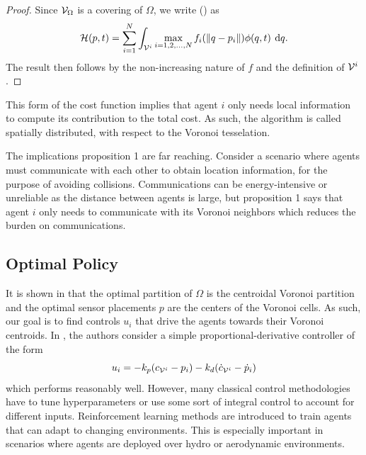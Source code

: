 \documentclass[10pt,conference]{IEEEtran}
\begin{document}
		\begin{proof}
			Since $\mathcal{V}_\Omega$ is a covering of $\Omega$, we write () as 
			\begin{equation*}
				\displaystyle \mathcal{H}(p,t) = \sum\limits_{i=1}^{N}{\int_{\V^i}{\max\limits_{i=1,2,\dots,N}{f_i(\,\norm{q - p_i})}\phi(q,t) \: \dif q}}.
			\end{equation*}
			The result then follows by the non-increasing nature of $f$ and the definition of $\mathcal{V}^i$.
		\end{proof}
		This form of the cost function implies that agent $i$ only needs local information to compute its contribution to the total cost. As such, the algorithm is called spatially distributed, with respect to the Voronoi tesselation. 
		
		The implications proposition 1 are far reaching. Consider a scenario where agents must communicate with each other to obtain location information, for the purpose of avoiding collisions. Communications can be energy-intensive or unreliable as the distance between agents is large, but proposition 1 says that agent $i$ only needs to communicate with its Voronoi neighbors which reduces the burden on communications. 
	\subsection{Optimal Policy}
		It is shown in \cite{Cortes:2004} that the optimal partition of $\Omega$ is the centroidal Voronoi partition and the optimal sensor placements $p$ are the centers of the Voronoi cells. As such, our goal is to find controls $u_i$ that drive the agents towards their Voronoi centroids. In \cite{Cortes:2004}, the authors consider a simple proportional-derivative controller of the form 
		\begin{equation*}
			\displaystyle u_i = -k_p(c_{\mathcal{V}^i} - p_i) - k_d(\dot{c}_{\mathcal{V}^i} - \dot{p}_i)
		\end{equation*}
		which performs reasonably well. However, many classical control methodologies have to tune hyperparameters or use some sort of integral control to account for different inputs. Reinforcement learning methods are introduced to train agents that can adapt to changing environments. This is especially important in scenarios where agents are deployed over hydro or aerodynamic environments.  
\end{document}
